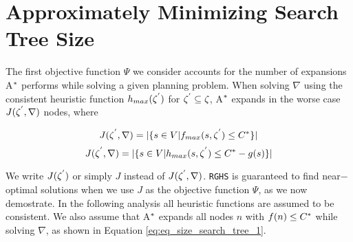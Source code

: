 \section{Approximately Minimizing Search Tree Size}
\noindent
The first objective function $\Psi$ we consider accounts for the number of expansions A$\sp{*}$ performs while solving a given planning problem. When solving $\nabla$ using the consistent heuristic function $h_{max}(\zeta\sp{'})$  for $\zeta\sp{'} \subseteq \zeta$, A$\sp{*}$ expands in the worse case $J(\zeta\sp{'},\nabla)$ nodes, where

\begin{equation}
J(\zeta\sp{'},\nabla) = |\{s \in V | f_{max}(s,\zeta\sp{'}) \leq C\sp{*}\}|
\label{eq:eq_size_search_tree_1}
\end{equation}
\begin{equation}
J(\zeta\sp{'},\nabla) = |\{s \in V | h_{max}(s,\zeta\sp{'}) \leq C\sp{*} - g(s)\}|
\label{eq:eq_size_search_tree_2}
\end{equation}

We write $J(\zeta\sp{'})$ or simply $J$ instead of $J(\zeta\sp{'},\nabla)$. \texttt{RGHS} is guaranteed to find near$-$optimal solutions when we use $J$ as the objective function $\Psi$, as we now demostrate. In the following analysis all heuristic functions are assumed to be consistent. We also assume that A$\sp{*}$ expands all nodes $n$ with $f(n) \leq C\sp{*}$ while solving $\nabla$, as shown in Equation \ref{eq:eq_size_search_tree_1}.

